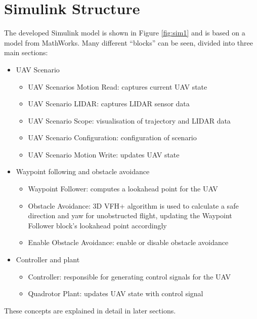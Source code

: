 \section{Simulink Structure}
The developed Simulink model is shown in Figure \ref{fig:sim1} and is based on a model from MathWorks. Many different ``blocks'' can be seen, divided into three main sections:
\begin{itemize}
    \item UAV Scenario
    \begin{itemize}
        \item UAV Scenarios Motion Read: captures current UAV state
        \item UAV Scenario LIDAR: captures LIDAR sensor data
        \item UAV Scenario Scope: visualisation of trajectory and LIDAR data
        \item UAV Scenario Configuration: configuration of scenario
        \item UAV Scenario Motion Write: updates UAV state
    \end{itemize}
    \item Waypoint following and obstacle avoidance
    \begin{itemize}
        \item Waypoint Follower: computes a lookahead point for the UAV
        \item Obstacle Avoidance: 3D VFH+ algorithm is used to calculate a safe direction and yaw for unobstructed flight, updating the Waypoint Follower block's lookahead point accordingly
        \item Enable Obstacle Avoidance: enable or disable obstacle avoidance
    \end{itemize}
    \item Controller and plant
    \begin{itemize}
        \item Controller: responsible for generating control signals for the UAV
        \item Quadrotor Plant: updates UAV state with control signal
    \end{itemize}
\end{itemize}
These concepts are explained in detail in later sections.
